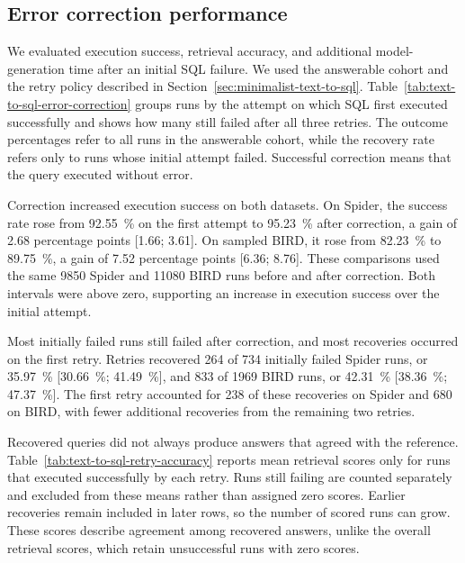 \subsection{Error correction performance}

We evaluated execution success, retrieval accuracy, and additional model-generation time after an initial
SQL failure. We used the answerable cohort and the retry policy described in
Section~\ref{sec:minimalist-text-to-sql}. Table~\ref{tab:text-to-sql-error-correction} groups runs by the
attempt on which SQL first executed successfully and shows how many still failed after all three retries. The
outcome percentages refer to all runs in the answerable cohort, while the recovery rate refers only to runs
whose initial attempt failed. Successful correction means that the query executed without error.



Correction increased execution success on both datasets. On Spider, the success rate rose from
\qty{92.55}{\percent} on the first attempt to \qty{95.23}{\percent} after correction, a gain of \num{2.68}
percentage points [\num{1.66}; \num{3.61}]. On sampled BIRD, it rose from \qty{82.23}{\percent} to
\qty{89.75}{\percent}, a gain of \num{7.52} percentage points [\num{6.36}; \num{8.76}]. These comparisons used
the same \num{9850} Spider and \num{11080} BIRD runs before and after correction. Both intervals were above
zero, supporting an increase in execution success over the initial attempt.

Most initially failed runs still failed after correction, and most recoveries occurred on the first retry.
Retries recovered \num{264} of \num{734} initially failed Spider runs, or \qty{35.97}{\percent}
[\qty{30.66}{\percent}; \qty{41.49}{\percent}], and \num{833} of \num{1969} BIRD runs, or \qty{42.31}{\percent}
[\qty{38.36}{\percent}; \qty{47.37}{\percent}]. The first retry accounted for \num{238} of these recoveries on Spider
and \num{680} on BIRD, with fewer additional recoveries from the remaining two retries.

Recovered queries did not always produce answers that agreed with the reference.
Table~\ref{tab:text-to-sql-retry-accuracy} reports mean retrieval scores only for runs that executed
successfully by each retry. Runs still failing are counted separately and excluded from these means rather
than assigned zero scores. Earlier recoveries remain included in later rows, so the number of scored runs
can grow. These scores describe agreement among recovered answers, unlike the overall retrieval scores,
which retain unsuccessful runs with zero scores.

